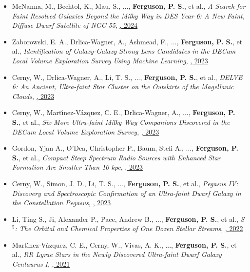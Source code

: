 \begin{itemize}[itemsep=1pt]
    \item {McNanna}, M., {Bechtol}, K., {Mau}, S., ..., \textbf{Ferguson, P. S.}, et al., \textit{{A Search for Faint Resolved Galaxies Beyond the Milky Way in DES Year 6: A New Faint, Diffuse Dwarf Satellite of NGC 55}}, \href{https://ui.adsabs.harvard.edu/abs/2024ApJ...961..126M}{\textbf{\apj}, 2024}
    \item {Zaborowski}, E. A., {Drlica-Wagner}, A., {Ashmead}, F., ..., \textbf{Ferguson, P. S.}, et al., \textit{{Identification of Galaxy-Galaxy Strong Lens Candidates in the DECam Local Volume Exploration Survey Using Machine Learning}}, \href{https://ui.adsabs.harvard.edu/abs/2023ApJ...954...68Z}{\textbf{\apj}, 2023}
    \item {Cerny}, W., {Drlica-Wagner}, A., {Li}, T. S., ..., \textbf{Ferguson, P. S.}, et al., \textit{{DELVE 6: An Ancient, Ultra-faint Star Cluster on the Outskirts of the Magellanic Clouds}}, \href{https://ui.adsabs.harvard.edu/abs/2023ApJ...953L..21C}{\textbf{\apjl}, 2023}
    \item {Cerny}, W., {Mart{\'\i}nez-V{\'a}zquez}, C. E., {Drlica-Wagner}, A., ..., \textbf{Ferguson, P. S.}, et al., \textit{{Six More Ultra-faint Milky Way Companions Discovered in the DECam Local Volume Exploration Survey}}, \href{https://ui.adsabs.harvard.edu/abs/2023ApJ...953....1C}{\textbf{\apj}, 2023}
    \item {Gordon}, Yjan A., {O'Dea}, Christopher P., {Baum}, Stefi A., ..., \textbf{Ferguson, P. S.}, et al., \textit{{Compact Steep Spectrum Radio Sources with Enhanced Star Formation Are Smaller Than 10 kpc}}, \href{https://ui.adsabs.harvard.edu/abs/2023ApJ...948L...9G}{\textbf{\apjl}, 2023}
    \item {Cerny}, W., {Simon}, J. D., {Li}, T. S., ..., \textbf{Ferguson, P. S.}, et al., \textit{{Pegasus IV: Discovery and Spectroscopic Confirmation of an Ultra-faint Dwarf Galaxy in the Constellation Pegasus}}, \href{https://ui.adsabs.harvard.edu/abs/2023ApJ...942..111C}{\textbf{\apj}, 2023}
    \item {Li}, Ting S., {Ji}, Alexander P., {Pace}, Andrew B., ..., \textbf{Ferguson, P. S.}, et al., \textit{{S $^{5}$: The Orbital and Chemical Properties of One Dozen Stellar Streams}}, \href{https://ui.adsabs.harvard.edu/abs/2022ApJ...928...30L}{\textbf{\apj}, 2022}
    \item {Mart{\'\i}nez-V{\'a}zquez}, C. E., {Cerny}, W., {Vivas}, A. K., ..., \textbf{Ferguson, P. S.}, et al., \textit{{RR Lyrae Stars in the Newly Discovered Ultra-faint Dwarf Galaxy Centaurus I}}, \href{https://ui.adsabs.harvard.edu/abs/2021AJ....162..253M}{\textbf{\aj}, 2021}

\end{itemize}
